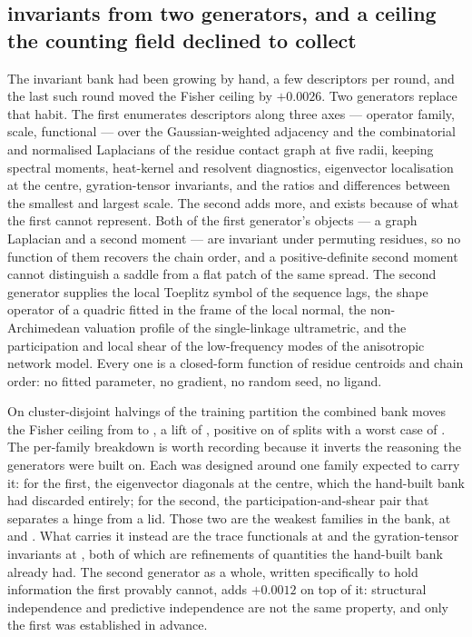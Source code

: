 \documentclass[11pt]{article}
\begin{document}
\subsection{\GenTotal{} invariants from two generators, and a ceiling the
counting field declined to collect}
\label{sec:banks}
The invariant bank had been growing by hand, a few descriptors per round, and
the last such round moved the Fisher ceiling by \(+0.0026\). Two generators
replace that habit. The first enumerates \GenOperator{} descriptors along three
axes --- operator family, scale, functional --- over the Gaussian-weighted
adjacency and the combinatorial and normalised Laplacians of the residue
contact graph at five radii, keeping spectral moments, heat-kernel and
resolvent diagnostics, eigenvector localisation at the centre, gyration-tensor
invariants, and the ratios and differences between the smallest and largest
scale. The second adds \GenChain{} more, and exists because of what the first
cannot represent. Both of the first generator's objects --- a graph Laplacian
and a second moment --- are invariant under permuting residues, so no function
of them recovers the chain order, and a positive-definite second moment cannot
distinguish a saddle from a flat patch of the same spread. The second generator
supplies the local Toeplitz symbol of the sequence lags, the shape operator of a
quadric fitted in the frame of the local normal, the non-Archimedean valuation
profile of the single-linkage ultrametric, and the participation and local
shear of the low-frequency modes of the anisotropic network model. Every one is
a closed-form function of residue centroids and chain order: no fitted
parameter, no gradient, no random seed, no ligand.

On \GenNSplits{} cluster-disjoint halvings of the training partition the
combined bank moves the Fisher ceiling from \GenCeilBase{} to \GenCeilFull{},
a lift of \GenCeilLift{}, positive on \GenNPositive{} of \GenNSplits{} splits
with a worst case of \GenCeilWorst{}. The per-family breakdown is worth
recording because it inverts the reasoning the generators were built on. Each
was designed around one family expected to carry it: for the first, the
eigenvector diagonals at the centre, which the hand-built bank had discarded
entirely; for the second, the participation-and-shear pair that separates a
hinge from a lid. Those two are the weakest families in the bank, at
\GenFamDiagonal{} and \GenFamHinge{}. What carries it instead are the trace
functionals at \GenFamTrace{} and the gyration-tensor invariants at
\GenFamGyration{}, both of which are refinements of quantities the hand-built
bank already had. The second generator as a whole, written specifically to hold
information the first provably cannot, adds \(+0.0012\) on top of it: structural
independence and predictive independence are not the same property, and only the
first was established in advance.
\end{document}
